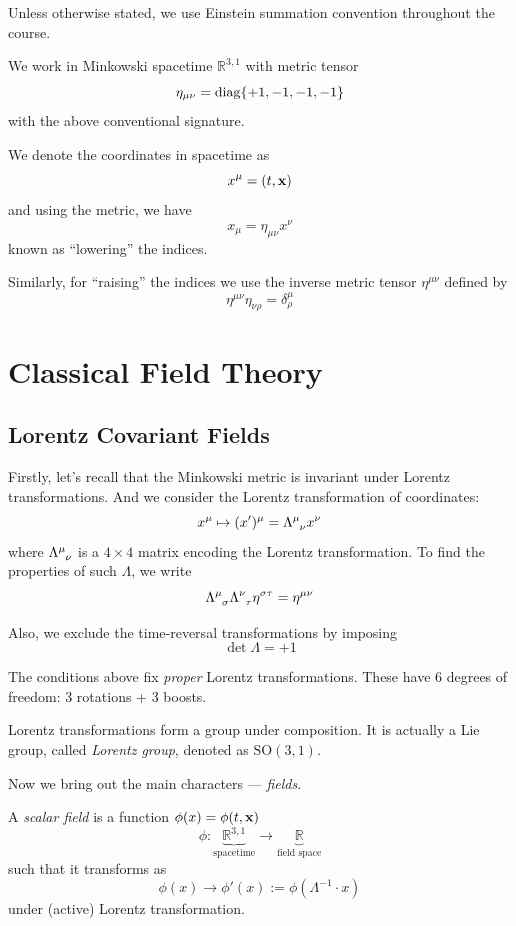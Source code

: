 \documentclass[a4paper,11pt]{article}
\begin{document}
	Unless otherwise stated, we use Einstein summation convention throughout the course.

	We work in Minkowski spacetime $\mathbb{R}^{3,1}$ with metric tensor
	\[
		\eta_{\mu\nu} = \operatorname{diag} \{+1, -1, -1, -1\}
	\]
	with the above conventional signature.

	We denote the coordinates in spacetime as 
	\[
		x^\mu = (t, \vb x)
	\]
	and using the metric, we have
	\[
		x_\mu = \eta_{\mu\nu} x^\nu
	\]
	known as ``lowering'' the indices. 
	
	Similarly, for ``raising'' the indices we use the inverse metric tensor $\eta^{\mu\nu}$ defined by
	\[
		\eta^{\mu\nu} \eta_{\nu\rho} = \delta^\mu_\rho
	\]
	\newpage
	\section{Classical Field Theory}

	\subsection{Lorentz Covariant Fields}

	Firstly, let's recall that the Minkowski metric is invariant under Lorentz transformations. And we consider the Lorentz transformation of coordinates:
	\begin{equation}
		x^\mu \mapsto (x')^\mu = \LT{\mu}{\nu}x^\nu
	\end{equation}
	where $\LT{\mu}{\nu}$ is a $4\times 4$ matrix encoding the Lorentz transformation. To find the properties of such $\Lambda$, we write
	\begin{equation}
		\LT{\mu}{\sigma}\LT{\nu}{\tau} \eta^{\sigma\tau} = \eta^{\mu\nu}
	\end{equation}

	Also, we exclude the time-reversal transformations by imposing
	\[
		\det \Lambda = + 1
	\]
	
	The conditions above fix \emph{proper} Lorentz transformations. These have 6 degrees of freedom: 3 rotations + 3 boosts. 

	Lorentz transformations form a group under composition. It is actually a Lie group, called \emph{Lorentz group}, denoted as $\mathrm{SO}(3,1)$.
	
	Now we bring out the main characters --- \emph{fields}.

	\begin{defi}
		A \emph{scalar field} is a function $\phi(x) = \phi(t, \vb x)$
		\[
			\phi : \underbrace{\mathbb{R}^{3,1}}_{\text{spacetime}} \to \underbrace{ \mathbb{R}}_{\text{field space}}
		\]
		such that it transforms as 
		\begin{equation}
			\phi(x) \to \phi'(x) := \phi(\Lambda^{-1} \cdot x)
		\end{equation}
		under (active) Lorentz transformation.
	\end{defi}
\end{document}
